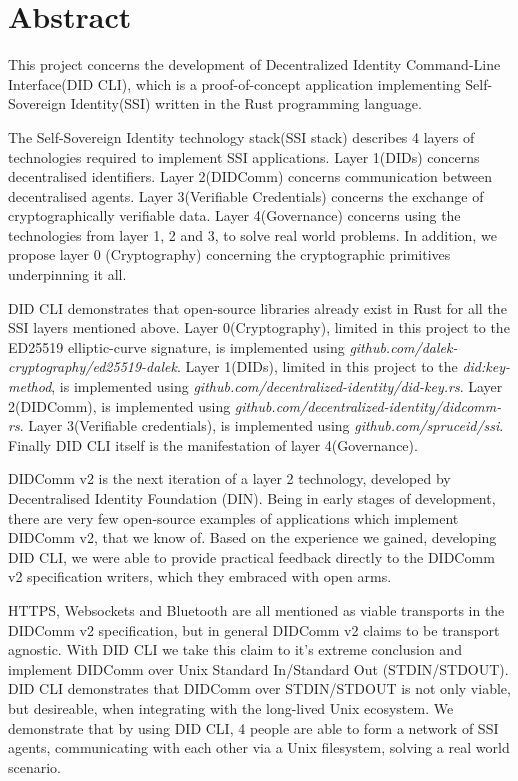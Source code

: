 \chapter*{Abstract}

This project concerns the development of Decentralized Identity Command-Line Interface(DID CLI), which is a proof-of-concept application implementing Self-Sovereign Identity(SSI) written in the Rust programming language.

The Self-Sovereign Identity technology stack(SSI stack) describes 4 layers of technologies required to implement SSI applications. Layer 1(DIDs) concerns decentralised identifiers. Layer 2(DIDComm) concerns communication between decentralised agents. Layer 3(Verifiable Credentials) concerns the exchange of cryptographically verifiable data. Layer 4(Governance) concerns using the technologies from layer 1, 2 and 3, to solve real world problems. In addition, we propose layer 0 (Cryptography) concerning the cryptographic primitives underpinning it all. 


DID CLI demonstrates that open-source libraries already exist in Rust for all the SSI layers mentioned above. Layer 0(Cryptography), limited in this project to the ED25519 elliptic-curve signature, is implemented using \newline \textit{github.com/dalek-cryptography/ed25519-dalek}. Layer 1(DIDs), limited in this project to the \textit{did:key-method}, is implemented using \textit{github.com/decentralized-identity/did-key.rs}. Layer 2(DIDComm), is implemented using \newline \textit{github.com/decentralized-identity/didcomm-rs}. Layer 3(Verifiable credentials), is implemented using \textit{github.com/spruceid/ssi}. Finally DID CLI itself is the manifestation of layer 4(Governance).


DIDComm v2 is the next iteration of a layer 2 technology, developed by Decentralised Identity Foundation (DIN). Being in early stages of development, there are very few open-source examples of applications which implement DIDComm v2, that we know of. Based on the experience we gained, developing DID CLI, we were able to provide practical feedback directly to the DIDComm v2 specification writers, which they embraced with open arms.


HTTPS, Websockets and Bluetooth are all mentioned as viable transports in the DIDComm v2 specification, but in general DIDComm v2 claims to be transport agnostic. With DID CLI we take this claim to it's extreme conclusion and implement DIDComm over Unix Standard In/Standard Out (STDIN/STDOUT). DID CLI demonstrates that DIDComm over STDIN/STDOUT is not only viable, but desireable, when integrating with the long-lived Unix ecosystem. We demonstrate that by using DID CLI, 4 people are able to form a network of SSI agents, communicating with each other via a Unix filesystem, solving a real world scenario.